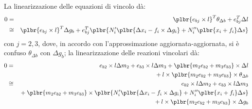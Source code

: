 \documentclass[12pt,dvips,fleqn,italian]{article}
\begin{document}
\noindent
La linearizzazione delle equazioni di vincolo d\`a:
\begin{eqnarray*}
	0 & = & \plbr{e_{bj}\times{l}}^T \theta_{\Delta{b}}
	+ e_{bj}^T \Delta{l} \\
	& \cong & \plbr{e_{bj}\times{l}}^T \Delta{g_b}
	+ e_{bj}^T\plbr{
		N'_i \plbr{\Delta{x_i} - f_i\times\Delta{g_i}}
		+ N''_i \plbr{x_i + f_i} \Delta{s}
	} 
\end{eqnarray*}
con $j=2,3$, dove, in accordo con l'approssimazione aggiornata-aggiornata,
si \`e confuso $\theta_{\Delta{b}}$ con $\Delta{g_b}$; 
la linearizzazione delle reazioni vincolari d\`a:
\begin{eqnarray*}
	0 & = & e_{b2}\times{l} \Delta{m_2} + e_{b3}\times{l} \Delta{m_3} 
	+ \plbr{m_2 e_{b2} + m_3 e_{b3}}\times \Delta{l} \\
	& & \mbox{} 
	+ l\times\plbr{m_2 e_{b2} + m_3 e_{b3}}\times \theta_{\Delta{b}} \\
	& \cong & e_{b2}\times{l} \Delta{m_2} + e_{b3}\times{l} \Delta{m_3} \\
	&& \mbox{} + \plbr{m_2 e_{b2} + m_3 e_{b3}}\times \plbr{
		N'_i \plbr{\Delta{x_i} - f_i\times\Delta{g_i}}
		+ N''_i \plbr{x_i + f_i} \Delta{s}
	} \\
	& & \mbox{} + l\times\plbr{m_2 e_{b2} + m_3 e_{b3}}\times \Delta{g_b}
\end{eqnarray*}
\end{document}
